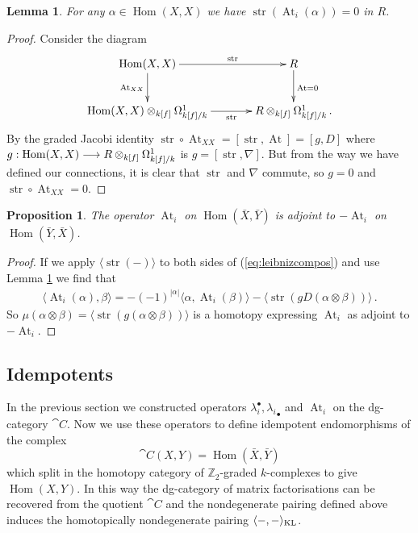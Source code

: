 \documentclass{compositio}
\newtheorem{proposition}[theorem]{Proposition}
\newtheorem{lemma}[theorem]{Lemma}
\theoremstyle{definition}
\numberwithin{equation}{section}
\def\Hom{\operatorname{Hom}}
\DeclareMathOperator{\str}{str}
\DeclareMathOperator{\At}{At}
\begin{document}
\begin{lemma}\label{lemma:stratiyahzero} For any $\alpha \in \Hom(X,X)$ we have $\str( \At_i( \alpha ) ) = 0$ in $R$.
\end{lemma}
\begin{proof}
Consider the diagram
\[
\xymatrix@C+1pc{
\Hom(X,X) \ar[d]_{\At_{XX}} \ar[r]^-{\str} & R \ar[d]^{\At = 0}\\
\Hom(X,X) \otimes_{k[f]} \Omega^1_{k[f]/k} \ar[r]_-{\str} & R \otimes_{k[f]} \Omega^1_{k[f]/k}\,.
}
\]
By the graded Jacobi identity $\str \circ \At_{XX} = [\str, \At] = [g,D]$ where $g: \Hom(X,X) \lto R \otimes_{k[f]} \Omega^1_{k[f]/k}$ is $g = [\str, \nabla]$. But from the way we have defined our connections, it is clear that $\str$ and $\nabla$ commute, so $g = 0$ and $\str \circ \At_{XX} = 0$.
\end{proof}

\begin{proposition} The operator $\At_i$ on $\Hom(\bar{X}, \bar{Y})$ is adjoint to $-\At_i$ on $\Hom(\bar{Y}, \bar{X})$.
\end{proposition}
\begin{proof}
If we apply $\langle \str( - ) \rangle$ to both sides of (\ref{eq:leibnizcompos}) and use Lemma \ref{lemma:stratiyahzero} we find that
\begin{align*}
\langle \At_i(\alpha), \beta \rangle = -(-1)^{|\alpha|} \langle \alpha,  \At_i(\beta) \rangle - \langle \str( gD(\alpha \otimes \beta) ) \rangle\,.
\end{align*}
So $\mu( \alpha \otimes \beta ) = \langle \str( g( \alpha \otimes \beta ) ) \rangle$ is a homotopy expressing $\At_i$ as adjoint to $-\At_i$.
\end{proof}

\subsection{Idempotents}\label{section:idempkl}

In the previous section we constructed operators $\lambda_i^\bullet, {\lambda_i}_\bullet$ and $\At_i$ on the dg-category $\cat{C}$. Now we use these operators to define idempotent endomorphisms of the complex
\[
\cat{C}(X,Y) = \Hom(\bar{X}, \bar{Y})
\]
which split in the homotopy category of $\mathbb{Z}_2$-graded $k$-complexes to give $\Hom(X,Y)$. In this way the dg-category of matrix factorisations can be recovered from the quotient $\cat{C}$ and the nondegenerate pairing defined above induces the homotopically nondegenerate pairing $\langle -, - \rangle_{\textup{KL}}$.
\end{document}
